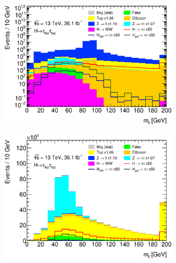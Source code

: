 \begin{figure}[htb]
    \centering
    \begin{subfigure}[t]{0.45\textwidth}
        \includegraphics[width=\textwidth]{./plots/event_selection/presel/eemm-CutOS-mvis-log.eps}
        \caption{}\label{fig:event_selection:cutflow:mllsf}
    \end{subfigure}
    \begin{subfigure}[t]{0.45\textwidth}
        \includegraphics[width=\textwidth]{./plots/event_selection/presel/emme-CutOS-mvis-lin.eps}
        \caption{}\label{fig:event_selection:cutflow:mlldf}
    \end{subfigure}
    \begin{subfigure}[t]{0.45\textwidth}

\end{subfigure}
\end{figure}
